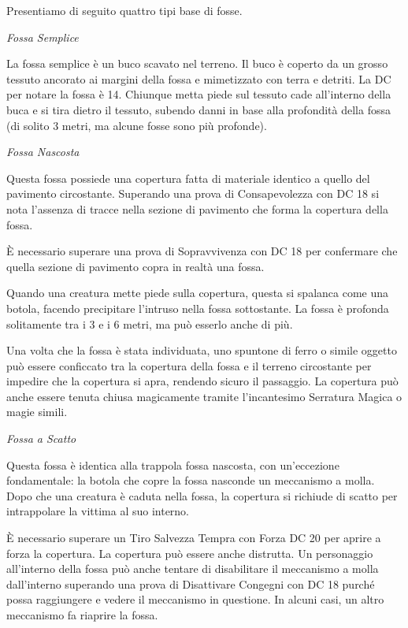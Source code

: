 \begin{multicols}{2}
Presentiamo di seguito quattro tipi base di fosse.

\medskip

\emph{Fossa Semplice}

La fossa semplice è un buco scavato nel terreno. Il buco è coperto da un grosso tessuto ancorato ai margini della fossa e mimetizzato con terra e detriti.
La DC per notare la fossa è 14. Chiunque metta piede sul tessuto cade all'interno della buca e si tira dietro il tessuto, subendo danni in base alla profondità della fossa (di solito 3 metri, ma alcune fosse sono più profonde).

\medskip

\emph{Fossa Nascosta}

Questa fossa possiede una copertura fatta di materiale identico a quello del pavimento circostante.
Superando una prova di Consapevolezza con DC 18 si nota l'assenza di tracce nella sezione di pavimento che forma la copertura della fossa.

È necessario superare una prova di Sopravvivenza con DC 18 per confermare che quella sezione di pavimento copra in realtà una fossa.

Quando una creatura mette piede sulla copertura, questa si spalanca come una botola, facendo precipitare l'intruso nella fossa sottostante. La fossa è profonda solitamente tra i 3 e i 6 metri, ma può esserlo anche di più.

Una volta che la fossa è stata individuata, uno spuntone di ferro o simile oggetto può essere conficcato tra la copertura della fossa e il terreno circostante per impedire che la copertura si apra, rendendo sicuro il passaggio. La copertura può anche essere tenuta chiusa magicamente tramite l'incantesimo Serratura Magica o magie simili.

\medskip
\emph{Fossa a Scatto}

Questa fossa è identica alla trappola fossa nascosta, con un'eccezione fondamentale: la botola che copre la fossa nasconde un meccanismo a molla. Dopo che una creatura è caduta nella fossa, la copertura si richiude di scatto per intrappolare la vittima al suo interno.

È necessario superare un Tiro Salvezza Tempra con Forza DC 20 per aprire a forza la copertura. La copertura può essere anche distrutta. Un personaggio all'interno della fossa può anche tentare di disabilitare il meccanismo a molla dall'interno superando una prova di Disattivare Congegni con DC 18 purché possa raggiungere e vedere il meccanismo in questione. In alcuni casi, un altro meccanismo fa riaprire la fossa.


\end{multicols}

